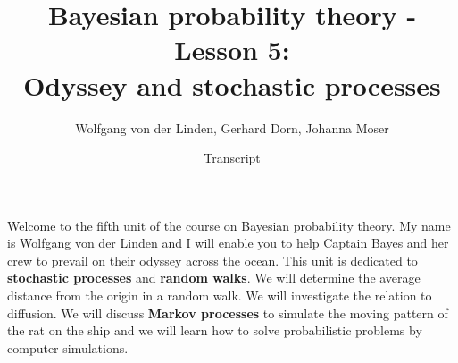 \documentclass[12pt, a4paper]{scrartcl}
\title{Bayesian probability theory - Lesson 5:\\
Odyssey and stochastic processes}
\author{Wolfgang von der Linden, Gerhard Dorn, Johanna Moser}
\date{Transcript}
\begin{document}
\setlength{\parindent}{0pt}
\maketitle
\onehalfspacing

Welcome to the fifth unit of the course on Bayesian probability theory. 
My name is Wolfgang von der Linden and I will enable you to help Captain Bayes and her crew to prevail on their odyssey across the ocean.
This unit is dedicated to \textbf{stochastic processes} and \textbf{random walks}. We will determine the average distance from the origin in a random walk. We will investigate the relation to diffusion. We will discuss \textbf{Markov processes} to simulate the moving pattern of the rat on the ship and we will learn how to solve probabilistic problems by computer simulations.\\
\end{document}
